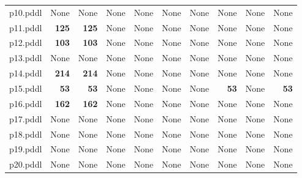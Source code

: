 \documentclass{article}
\begin{document}
\begin{tabular}{@{}lrrrrrrrrr@{}}
p10.pddl & \multicolumn{1}{|l|}{None} & \multicolumn{1}{|l|}{None} & \multicolumn{1}{|l|}{None} & \multicolumn{1}{|l|}{None} & \multicolumn{1}{|l|}{None} & \multicolumn{1}{|l|}{None} & \multicolumn{1}{|l|}{None} & \multicolumn{1}{|l|}{None} & \multicolumn{1}{|l|}{None} \\
p11.pddl & \textbf{125} & \textbf{125} & \multicolumn{1}{|l|}{None} & \multicolumn{1}{|l|}{None} & \multicolumn{1}{|l|}{None} & \multicolumn{1}{|l|}{None} & \multicolumn{1}{|l|}{None} & \multicolumn{1}{|l|}{None} & \multicolumn{1}{|l|}{None} \\
p12.pddl & \textbf{103} & \textbf{103} & \multicolumn{1}{|l|}{None} & \multicolumn{1}{|l|}{None} & \multicolumn{1}{|l|}{None} & \multicolumn{1}{|l|}{None} & \multicolumn{1}{|l|}{None} & \multicolumn{1}{|l|}{None} & \multicolumn{1}{|l|}{None} \\
p13.pddl & \multicolumn{1}{|l|}{None} & \multicolumn{1}{|l|}{None} & \multicolumn{1}{|l|}{None} & \multicolumn{1}{|l|}{None} & \multicolumn{1}{|l|}{None} & \multicolumn{1}{|l|}{None} & \multicolumn{1}{|l|}{None} & \multicolumn{1}{|l|}{None} & \multicolumn{1}{|l|}{None} \\
p14.pddl & \textbf{214} & \textbf{214} & \multicolumn{1}{|l|}{None} & \multicolumn{1}{|l|}{None} & \multicolumn{1}{|l|}{None} & \multicolumn{1}{|l|}{None} & \multicolumn{1}{|l|}{None} & \multicolumn{1}{|l|}{None} & \multicolumn{1}{|l|}{None} \\
p15.pddl & \textbf{53} & \textbf{53} & \multicolumn{1}{|l|}{None} & \multicolumn{1}{|l|}{None} & \multicolumn{1}{|l|}{None} & \multicolumn{1}{|l|}{None} & \textbf{53} & \multicolumn{1}{|l|}{None} & \textbf{53} \\
p16.pddl & \textbf{162} & \textbf{162} & \multicolumn{1}{|l|}{None} & \multicolumn{1}{|l|}{None} & \multicolumn{1}{|l|}{None} & \multicolumn{1}{|l|}{None} & \multicolumn{1}{|l|}{None} & \multicolumn{1}{|l|}{None} & \multicolumn{1}{|l|}{None} \\
p17.pddl & \multicolumn{1}{|l|}{None} & \multicolumn{1}{|l|}{None} & \multicolumn{1}{|l|}{None} & \multicolumn{1}{|l|}{None} & \multicolumn{1}{|l|}{None} & \multicolumn{1}{|l|}{None} & \multicolumn{1}{|l|}{None} & \multicolumn{1}{|l|}{None} & \multicolumn{1}{|l|}{None} \\
p18.pddl & \multicolumn{1}{|l|}{None} & \multicolumn{1}{|l|}{None} & \multicolumn{1}{|l|}{None} & \multicolumn{1}{|l|}{None} & \multicolumn{1}{|l|}{None} & \multicolumn{1}{|l|}{None} & \multicolumn{1}{|l|}{None} & \multicolumn{1}{|l|}{None} & \multicolumn{1}{|l|}{None} \\
p19.pddl & \multicolumn{1}{|l|}{None} & \multicolumn{1}{|l|}{None} & \multicolumn{1}{|l|}{None} & \multicolumn{1}{|l|}{None} & \multicolumn{1}{|l|}{None} & \multicolumn{1}{|l|}{None} & \multicolumn{1}{|l|}{None} & \multicolumn{1}{|l|}{None} & \multicolumn{1}{|l|}{None} \\
p20.pddl & \multicolumn{1}{|l|}{None} & \multicolumn{1}{|l|}{None} & \multicolumn{1}{|l|}{None} & \multicolumn{1}{|l|}{None} & \multicolumn{1}{|l|}{None} & \multicolumn{1}{|l|}{None} & \multicolumn{1}{|l|}{None} & \multicolumn{1}{|l|}{None} & \multicolumn{1}{|l|}{None} \\
\end{tabular}
\end{document}
